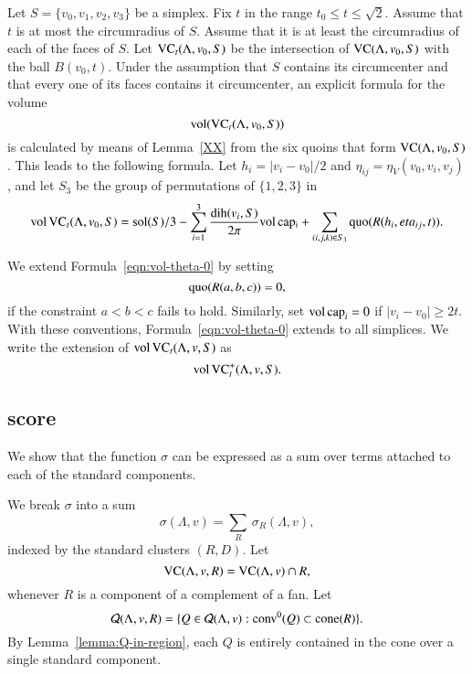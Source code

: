  Let $S=\{v_0,v_1,v_2,v_3\}$ be a simplex. Fix $t$ in the range
$t_0\le t\le\sqrt2$.  Assume that $t$ is at most the circumradius
of $S$. Assume that it is at least the circumradius of each of the
faces of $S$.  Let ${\operatorname{VC}}_t(\Lambda,v_0,S)$ be the intersection of
${\operatorname{VC}}(\Lambda,v_0,S)$ with the ball $B(v_0,t)$. Under the assumption
that $S$ contains its circumcenter and that every one of its faces
contains it circumcenter, an explicit formula for the volume
$${\operatorname{vol}}({\operatorname{VC}}_t(\Lambda,v_0,S))$$ is calculated by means of
Lemma~\ref{XX} from the six quoins that form ${\operatorname{VC}}(\Lambda,v_0,S)$.
This leads to the
following formula. Let $h_i = |v_i-v_0|/2$ and
$\eta_{ij}=\eta_V(v_0,v_i,v_j)$, and let $S_3$ be the group of
permutations of $\{1,2,3\}$ in
\begin{equation}
   \op{vol}\,\op{VC}_t(\Lambda,v_0,S) =
   \sol(S)/3 - \sum_{i=1}^3 \frac{\dih(v_i,S)}{2\pi}\op{vol}\,\op{cap_i}
   +\sum_{(i,j,k)\in S_3} \quo(R(h_i,\eta_{ij},t)).
   \tlabel{eqn:vol-theta-0}
\end{equation}


We extend Formula~\ref{eqn:vol-theta-0} by setting
    $$\operatorname{quo}(R(a,b,c)) = 0,$$
if the constraint $a < b < c$ fails to hold.  Similarly, set
${\operatorname{vol}}\,{\operatorname{cap}}_i=0$ if $|v_i-v_0|\ge 2t$.  With these
conventions,  Formula~\ref{eqn:vol-theta-0} extends to all
simplices.  We write the extension of ${\operatorname{vol}}\,{\operatorname{VC}}_t(\Lambda,v,S)$
as
$${\operatorname{vol}}\,{{\operatorname{VC}}^+_t}(\Lambda,v,S).$$


\subsection{score}

We show that the function $\sigma$ can be expressed as a sum over
terms attached to each of the standard components.




We break $\sigma$ into a sum
   \begin{equation}
   \sigma(\Lambda,v) = \sum_R\,\sigma_R(\Lambda,v),
   \end{equation}
indexed by the standard clusters $(R,D)$.  Let
   $$
   {\operatorname{VC}}(\Lambda,v,R) = {\operatorname{VC}}(\Lambda,v)\cap R,
   $$
whenever $R$ is a component of a complement of a fan.  Let
   $$
   {\mathcal Q}(\Lambda,v,R) = \{Q\in {\mathcal Q}(\Lambda,v) : {\operatorname{conv}}^0(Q)\subset {\operatorname{cone}}(R)\}.
   $$
By Lemma~\ref{lemma:Q-in-region},
 each $Q$ is entirely contained in the cone over a single
standard component.

